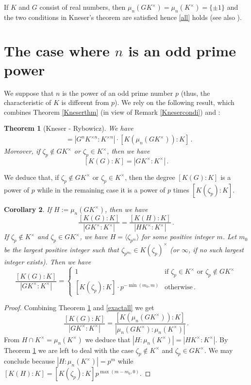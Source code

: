 \documentclass[11pt, a4paper]{amsart}
\newtheorem {thm}{Theorem}
\newtheorem {cor}[thm]{Corollary}
\theoremstyle{definition}
\begin{document}
If $K$ and $G$ consist of real numbers, then $\mu_n(GK^\times)=\mu_n(K^\times)=\{\pm 1\}$ and the two conditions in Kneser's theorem are satisfied hence \eqref{all} holds (see also  \cite[Theorem 2.2]{Rybowicz}).

\section{The case where $n$ is an odd prime power}

We suppose that $n$ is the power of an odd prime number $p$ (thus, the characteristic of $K$ is different from $p$). 
We rely on the following result, which combines Theorem \ref{Kneserthm} (in view of  Remark \ref{Knesercondi}) and \cite[Theorem 2.3]{Rybowicz}: 

\begin{thm}[Kneser - Rybowicz]\label{thmKR}
We have
\begin{align*}
[K(G):K] &= |G^nK^{\times n}:K^{\times n}| \cdot [K(\mu_{n}(GK^\times)):K]\,.
\end{align*}
Moreover, if $\zeta_p\notin GK^\times$ or $\zeta_p\in K^\times$, then we have 
$$[K(G):K]= |GK^{\times}:K^{\times}|\,.$$
\end{thm}

We deduce that, if $\zeta_p\notin GK^\times$ or $\zeta_p\in K^\times$, then the degree $[K(G):K]$ is a power of $p$ while in the remaining case it is a power of $p$ times $[K(\zeta_p):K]$.


\begin{cor}\label{corbetterp}
If $H:=\mu_{n}(GK^\times)$, then we have
$$\frac{[K(G):K]}
{|GK^{\times}:K^{\times}|}=\frac{[K(H):K]}
{|HK^{\times}:K^{\times}|}\,.$$
If $\zeta_p\notin K^\times$ and $\zeta_p\in GK^\times$, we have  $H=\langle \zeta_{p^m}\rangle$ for some positive integer $m$. Let $m_0$ be the largest positive integer such that $\zeta_{p^{m_0}}\in K(\zeta_p)^\times$ (or $\infty$, if no such largest integer exists). Then we have
$$\frac{[K(G):K]}
{|GK^{\times}:K^{\times}|}=\begin{cases} 1 & \text{if $\zeta_p\in K^\times$ or $\zeta_p\notin GK^\times$}\\
[K(\zeta_p):K] \cdot p^{-{\min(m_0,m)}} & \text{otherwise}\,.
\end{cases}
$$
\end{cor}
\begin{proof}
    Combining Theorem \ref{thmKR} and  \eqref{exactall} we get
$$\frac{[K(G):K]}
{|GK^{\times}:K^{\times}|}=\frac{[K(\mu_{n}(GK^\times)):K]}{| \mu_{n}(GK^\times): \mu_{n}(K^\times)|}\,.$$
From $H\cap K^{\times}=\mu_{n}(K^\times)$ we deduce that $|H: \mu_{n}(K^\times)|=|HK^{\times}:K^{\times}|$.
By Theorem \ref{thmKR} we are left to deal with the case $\zeta_p\notin K^\times$ and $\zeta_p\in GK^\times$. We may conclude because $|H: \mu_{n}(K^\times)|=p^m$ while $[K(H):K]=[K(\zeta_p):K]p^{\max(m-m_0,0)}$.
\end{proof}
\end{document}
